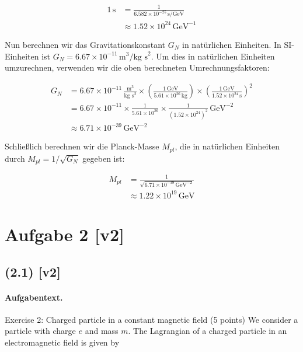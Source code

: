 \documentclass[11pt,a4paper]{article}
\begin{document}
\begin{align*}
1 \, \text{s} &= \frac{1}{6.582 \times 10^{-25} \, \text{s/GeV}} \\
&\approx 1.52 \times 10^{24} \, \text{GeV}^{-1}
\end{align*}

Nun berechnen wir das Gravitationskonstant $G_N$ in natürlichen Einheiten. In SI-Einheiten ist $G_N = 6.67 \times 10^{-11} \, \text{m}^3/\text{kg s}^2$. Um dies in natürlichen Einheiten umzurechnen, verwenden wir die oben berechneten Umrechnungsfaktoren:

\begin{align*}
G_N &= 6.67 \times 10^{-11} \, \frac{\text{m}^3}{\text{kg s}^2} \times \left( \frac{1 \, \text{GeV}}{5.61 \times 10^{26} \, \text{kg}} \right) \times \left( \frac{1 \, \text{GeV}}{1.52 \times 10^{24} \, \text{s}} \right)^2 \\
&= 6.67 \times 10^{-11} \times \frac{1}{5.61 \times 10^{26}} \times \frac{1}{(1.52 \times 10^{24})^2} \, \text{GeV}^{-2} \\
&\approx 6.71 \times 10^{-39} \, \text{GeV}^{-2}
\end{align*}

Schließlich berechnen wir die Planck-Masse $M_{pl}$, die in natürlichen Einheiten durch $M_{pl} = 1/\sqrt{G_N}$ gegeben ist:

\begin{align*}
M_{pl} &= \frac{1}{\sqrt{6.71 \times 10^{-39} \, \text{GeV}^{-2}}} \\
&\approx 1.22 \times 10^{19} \, \text{GeV}
\end{align*}


\section*{Aufgabe 2 [v2]}
\subsection*{(2.1) [v2]}
\paragraph{Aufgabentext.}
Exercise 2: Charged particle in a constant magnetic field (5 points)
We consider a particle with charge $e$ and mass $m$. The Lagrangian of a charged particle in an electromagnetic field is given by
\end{document}
